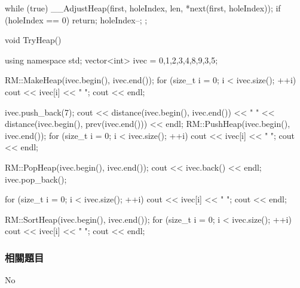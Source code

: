 \begin{Code}
{{        while (true)
        {
            __AdjustHeap(first, holeIndex, len, *next(first, holeIndex));
            if (holeIndex == 0) return;
            holeIndex--;
        }
    }
};

void TryHeap()
{
    using namespace std;
    vector<int> ivec = {0,1,2,3,4,8,9,3,5};

    RM::MakeHeap(ivec.begin(), ivec.end());
    for (size_t i = 0; i < ivec.size(); ++i)
        cout << ivec[i] << " ";
    cout << endl;

    ivec.push_back(7);
    cout << distance(ivec.begin(), ivec.end())
         << " " << distance(ivec.begin(), prev(ivec.end())) << endl;
    RM::PushHeap(ivec.begin(), ivec.end());
    for (size_t i = 0; i < ivec.size(); ++i)
        cout << ivec[i] << " ";
    cout << endl;

    RM::PopHeap(ivec.begin(), ivec.end());
    cout << ivec.back() << endl;
    ivec.pop_back();

    for (size_t i = 0; i < ivec.size(); ++i)
        cout << ivec[i] << " ";
    cout << endl;

    RM::SortHeap(ivec.begin(), ivec.end());
    for (size_t i = 0; i < ivec.size(); ++i)
        cout << ivec[i] << " ";
    cout << endl;
}
\end{Code}

\subsubsection{相關題目}
No
